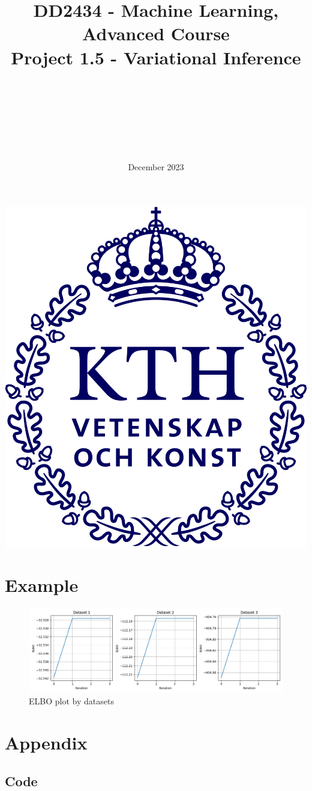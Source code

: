 \documentclass{article}
\title{DD2434 - Machine Learning, Advanced Course \\ Project 1.5 - Variational Inference}
\author{\authorFst \\ \emailFst \and \authorSnd \\ \emailSnd \and \authorTrd \\ \emailTrd \and \authorFrth \\ \emailFrth}
\date{December 2023}
\begin{document}
\maketitle

\begin{center}
    \includegraphics[scale=0.5]{KTH_logo_RGB_bla.png}
\end{center}

\thispagestyle{empty}

\newpage
\tableofcontents
\newpage

\section{Example}

\begin{figure}[H]
    \centering
    \includegraphics[scale=0.5]{images/15_elbo.png}
    \caption{ELBO plot by datasets}
    \label{fig:3.15.2}
\end{figure}

\newpage
\appendix
\section{Appendix}
\subsection{Code}\label{appendix:code}
\end{document}
